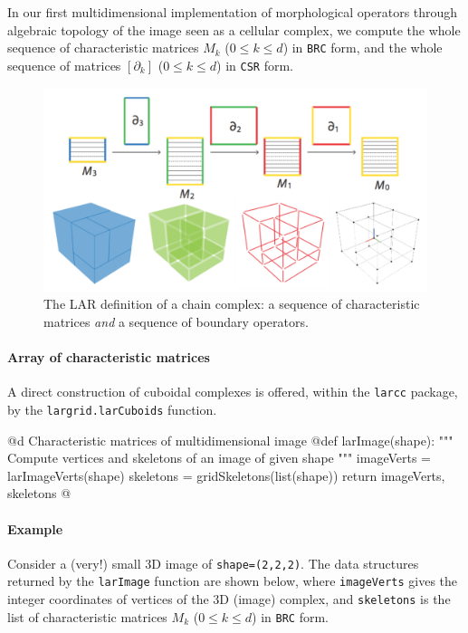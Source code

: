 \documentclass[11pt,oneside]{article}	%
\begin{document}
In our first multidimensional implementation of morphological operators through algebraic topology of the image seen as a cellular complex, we compute the whole sequence of characteristic matrices $M_k$ ($0\leq k \leq d$) in \texttt{BRC} form, and the whole sequence of matrices $[\partial_k]$ ($0\leq k \leq d$) in \texttt{CSR} form.

\begin{figure}[htbp] %
   \centering
   \includegraphics[width=0.7\linewidth]{images/larcomplex} 
   \caption{The LAR definition of  a chain complex: a sequence of characteristic matrices \emph{and} a sequence of boundary operators.}
   \label{fig:example}
\end{figure}

\paragraph{Array of characteristic matrices}

A direct construction of cuboidal complexes is offered, within the \texttt{larcc} package, by the \texttt{largrid.larCuboids} function. 

@d Characteristic matrices of multidimensional image
@{def larImage(shape):
	""" Compute vertices and skeletons of an image of given shape """
	imageVerts = larImageVerts(shape)
	skeletons = gridSkeletons(list(shape))
	return imageVerts, skeletons
@}

\paragraph{Example}
Consider a (very!) small 3D image of \texttt{shape=(2,2,2)}. The data structures returned by the \texttt{larImage} function are shown below, where \texttt{imageVerts} gives the integer coordinates of vertices of the 3D (image) complex, and \texttt{skeletons} is the list of characteristic matrices $M_k$ ($0\leq k\leq d$) in \texttt{BRC} form.
\end{document}
